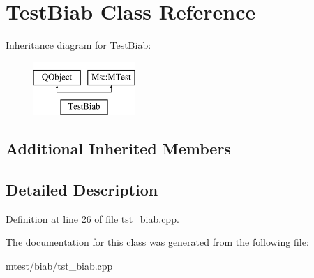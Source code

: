 \hypertarget{class_test_biab}{}\section{Test\+Biab Class Reference}
\label{class_test_biab}
Inheritance diagram for Test\+Biab\+:\begin{figure}[H]
\begin{center}
\leavevmode
\includegraphics[height=2.000000cm]{class_test_biab}
\end{center}
\end{figure}
\subsection*{Additional Inherited Members}


\subsection{Detailed Description}


Definition at line 26 of file tst\+\_\+biab.\+cpp.



The documentation for this class was generated from the following file\+:\begin{DoxyCompactItemize}
\item 
mtest/biab/tst\+\_\+biab.\+cpp\end{DoxyCompactItemize}
